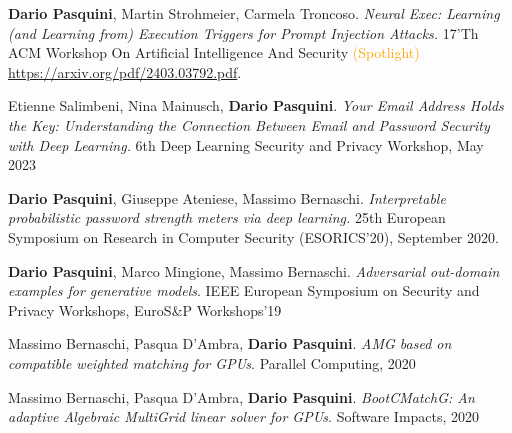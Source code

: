 \documentclass[margin, 10pt]{article} %
\begin{document}
\begin{thebibliography}{99}
\setcounter{enumiv}{7} 

	\textbf{Dario Pasquini},  Martin Strohmeier, Carmela Troncoso. \textit{Neural Exec: Learning (and Learning from) Execution Triggers for Prompt Injection Attacks.} 17'Th ACM Workshop On Artificial Intelligence And Security \textcolor{orange}{(Spotlight)} \url{https://arxiv.org/pdf/2403.03792.pdf}.

	
	Etienne Salimbeni, Nina Mainusch, \textbf{Dario Pasquini}. \textit{Your Email Address Holds the Key: Understanding the Connection Between Email and Password Security with Deep Learning.} 6th Deep Learning Security and Privacy Workshop, May 2023

\textbf{Dario Pasquini}, Giuseppe Ateniese, Massimo Bernaschi. \textit{Interpretable probabilistic password strength meters via deep learning.}  25th European Symposium on Research in Computer Security (\mbox{ESORICS}'20), September 2020. 

  \textbf{Dario Pasquini}, Marco Mingione,  Massimo Bernaschi. \textit{Adversarial out-domain examples for generative models}. IEEE European Symposium on Security and Privacy Workshops, EuroS\&P Workshops'19

Massimo Bernaschi, Pasqua D’Ambra,  \textbf{Dario Pasquini}.\textit{ AMG based on compatible weighted matching for GPUs}. Parallel Computing, 2020

 Massimo Bernaschi, Pasqua D’Ambra,  \textbf{Dario Pasquini}.\textit{ BootCMatchG: An adaptive Algebraic MultiGrid linear solver for GPUs}. Software Impacts, 2020
\end{thebibliography}
\end{document}
